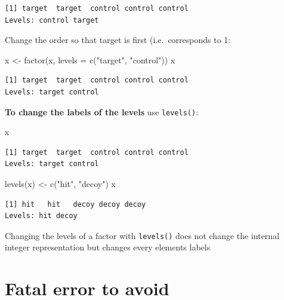 \documentclass[
]{book}
\newenvironment{Shaded}{\begin{snugshade}}{\end{snugshade}}
\newcommand{\AttributeTok}[1]{\textcolor[rgb]{0.77,0.63,0.00}{#1}}
\newcommand{\FunctionTok}[1]{\textcolor[rgb]{0.00,0.00,0.00}{#1}}
\newcommand{\NormalTok}[1]{#1}
\newcommand{\OtherTok}[1]{\textcolor[rgb]{0.56,0.35,0.01}{#1}}
\newcommand{\StringTok}[1]{\textcolor[rgb]{0.31,0.60,0.02}{#1}}
\begin{document}
\begin{verbatim}
[1] target  target  control control control
Levels: control target
\end{verbatim}

Change the order so that target is first (i.e.~corresponds to 1:

\begin{Shaded}
\begin{Highlighting}[]
\NormalTok{x }\OtherTok{\textless{}{-}} \FunctionTok{factor}\NormalTok{(x, }\AttributeTok{levels =} \FunctionTok{c}\NormalTok{(}\StringTok{"target"}\NormalTok{, }\StringTok{"control"}\NormalTok{))}
\NormalTok{x}
\end{Highlighting}
\end{Shaded}

\begin{verbatim}
[1] target  target  control control control
Levels: target control
\end{verbatim}

\textbf{To change the labels of the levels} use \texttt{levels()}:

\begin{Shaded}
\begin{Highlighting}[]
\NormalTok{x}
\end{Highlighting}
\end{Shaded}

\begin{verbatim}
[1] target  target  control control control
Levels: target control
\end{verbatim}

\begin{Shaded}
\begin{Highlighting}[]
\FunctionTok{levels}\NormalTok{(x) }\OtherTok{\textless{}{-}} \FunctionTok{c}\NormalTok{(}\StringTok{"hit"}\NormalTok{, }\StringTok{"decoy"}\NormalTok{)}
\NormalTok{x}
\end{Highlighting}
\end{Shaded}

\begin{verbatim}
[1] hit   hit   decoy decoy decoy
Levels: hit decoy
\end{verbatim}

\begin{Warning}
Changing the levels of a factor with \texttt{levels()} does not change
the internal integer representation but changes every elements labels
\end{Warning}

\hypertarget{fatal-error-to-avoid}{%
\section{Fatal error to avoid}\label{fatal-error-to-avoid}}
\end{document}
